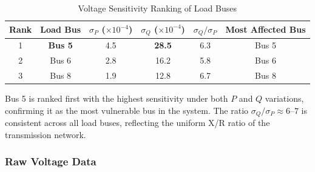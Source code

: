 \documentclass[12pt, a4paper]{article}
\begin{document}
\begin{table}[htbp]
\centering
\caption{Voltage Sensitivity Ranking of Load Buses}
\label{tab:sens_ranking}
\begin{tabular}{c c c c c c}
\toprule
\textbf{Rank} & \textbf{Load Bus} & \textbf{$\sigma_P$ ($\times 10^{-4}$)} & \textbf{$\sigma_Q$ ($\times 10^{-4}$)} & \textbf{$\sigma_Q / \sigma_P$} & \textbf{Most Affected Bus} \\
\midrule
1 & \textbf{Bus 5} & 4.5 & \textbf{28.5} & 6.3 & Bus 5 \\
2 & Bus 6 & 2.8 & 16.2 & 5.8 & Bus 6 \\
3 & Bus 8 & 1.9 & 12.8 & 6.7 & Bus 8 \\
\bottomrule
\end{tabular}
\end{table}

Bus 5 is ranked first with the highest sensitivity under both $P$ and $Q$ variations, confirming it as the most vulnerable bus in the system. The ratio $\sigma_Q / \sigma_P \approx 6$--$7$ is consistent across all load buses, reflecting the uniform X/R ratio of the transmission network.

\subsubsection{Raw Voltage Data}
\begin{table}[htbp]
\centering
\caption{Bus Voltage Magnitudes Under Load Variations}
\label{tab:raw_sensitivity}
\end{table}
\end{document}
